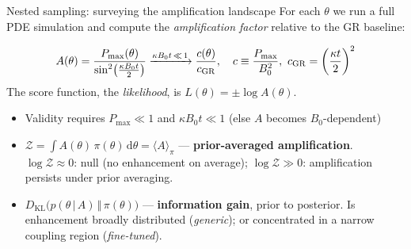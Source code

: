 \begin{frame}{Nested sampling: surveying the amplification landscape}
  For each $\theta$ we run a full PDE simulation and compute the \emph{amplification factor} relative to the GR baseline:

  \vspace{-0.8em}
  \[
    A(\theta) = \frac{P_{\max}(\theta)}{\sin^2 \bigl(\tfrac{\kappa B_0 t}{2}\bigr)}
    \xrightarrow{\kappa B_0 t \,\ll\, 1}
    \frac{c(\theta)}{c_{\rm GR}},
    \quad
    c \equiv \frac{P_{\max}}{B_0^{2}},\
    c_{\rm GR} = \left(\frac{\kappa t}{2}\right)^{2}
  \]
  The score function, the \emph{likelihood}, is $L(\theta) = \pm \log A(\theta)$.
  
  \begin{itemize}
    \item Validity requires $P_{\max}\ll 1$ and $\kappa B_0 t \ll 1$ (else $A$ becomes $B_0$-dependent)

    \item $\mathcal{Z} = \int A(\theta)\,\pi(\theta)\,\mathrm{d}\theta = \langle A\rangle_\pi$ ---
      \textbf{prior-averaged amplification}.\\
      $\log\mathcal{Z}\approx 0$: null (no enhancement on average);\quad
      $\log\mathcal{Z} \gg 0$: amplification persists under prior averaging.

    \item $D_{\mathrm{KL}} \bigl(p(\theta\,|\,A)\,\Vert\,\pi(\theta)\bigr)$ ---
      \textbf{information gain}, prior to posterior. Is enhancement broadly distributed (\emph{generic}); or concentrated in a narrow coupling region (\emph{fine-tuned}).

  \end{itemize}
\end{frame}
